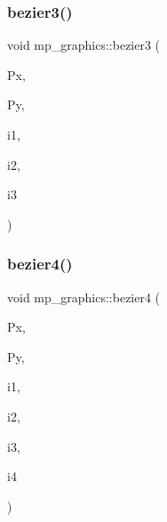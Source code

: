 \subsubsection{\texorpdfstring{bezier3()}{bezier3()}}
{\footnotesize\ttfamily void mp\+\_\+graphics\+::bezier3 (\begin{DoxyParamCaption}\item[{\mbox{\hyperlink{galois_8h_a09fddde158a3a20bd2dcadb609de11dc}{I\+NT}} $\ast$}]{Px,  }\item[{\mbox{\hyperlink{galois_8h_a09fddde158a3a20bd2dcadb609de11dc}{I\+NT}} $\ast$}]{Py,  }\item[{\mbox{\hyperlink{galois_8h_a09fddde158a3a20bd2dcadb609de11dc}{I\+NT}}}]{i1,  }\item[{\mbox{\hyperlink{galois_8h_a09fddde158a3a20bd2dcadb609de11dc}{I\+NT}}}]{i2,  }\item[{\mbox{\hyperlink{galois_8h_a09fddde158a3a20bd2dcadb609de11dc}{I\+NT}}}]{i3 }\end{DoxyParamCaption})}

\mbox{\label{classmp__graphics_aa5623598bc1d3dcf286282edaebbc4d2}} 
\subsubsection{\texorpdfstring{bezier4()}{bezier4()}}
{\footnotesize\ttfamily void mp\+\_\+graphics\+::bezier4 (\begin{DoxyParamCaption}\item[{\mbox{\hyperlink{galois_8h_a09fddde158a3a20bd2dcadb609de11dc}{I\+NT}} $\ast$}]{Px,  }\item[{\mbox{\hyperlink{galois_8h_a09fddde158a3a20bd2dcadb609de11dc}{I\+NT}} $\ast$}]{Py,  }\item[{\mbox{\hyperlink{galois_8h_a09fddde158a3a20bd2dcadb609de11dc}{I\+NT}}}]{i1,  }\item[{\mbox{\hyperlink{galois_8h_a09fddde158a3a20bd2dcadb609de11dc}{I\+NT}}}]{i2,  }\item[{\mbox{\hyperlink{galois_8h_a09fddde158a3a20bd2dcadb609de11dc}{I\+NT}}}]{i3,  }\item[{\mbox{\hyperlink{galois_8h_a09fddde158a3a20bd2dcadb609de11dc}{I\+NT}}}]{i4 }\end{DoxyParamCaption})}

\mbox{\label{classmp__graphics_a18c86dddf715adae7c325d9d4f35f126}} 
